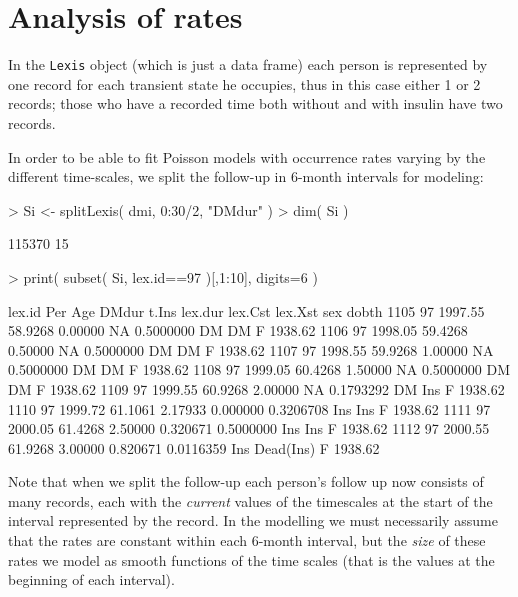 \documentclass[a4paper,twoside,12pt]{report}
\begin{document}
\section{Analysis of rates}

In the \texttt{Lexis} object (which is just a data frame) each person
is represented by one record for each transient state he occupies,
thus in this case either 1 or 2 records; those who have a recorded
time both without and with insulin have two records.

In order to be able to fit Poisson models with occurrence rates varying
by the different time-scales, we split the follow-up in 6-month intervals
for modeling:
\begin{Schunk}
\begin{Sinput}
> Si <- splitLexis( dmi, 0:30/2, "DMdur" )
> dim( Si )
\end{Sinput}
\begin{Soutput}
[1] 115370     15
\end{Soutput}
\begin{Sinput}
> print( subset( Si, lex.id==97 )[,1:10], digits=6 )
\end{Sinput}
\begin{Soutput}
     lex.id     Per     Age   DMdur    t.Ins   lex.dur lex.Cst   lex.Xst sex   dobth
1105     97 1997.55 58.9268 0.00000       NA 0.5000000      DM        DM   F 1938.62
1106     97 1998.05 59.4268 0.50000       NA 0.5000000      DM        DM   F 1938.62
1107     97 1998.55 59.9268 1.00000       NA 0.5000000      DM        DM   F 1938.62
1108     97 1999.05 60.4268 1.50000       NA 0.5000000      DM        DM   F 1938.62
1109     97 1999.55 60.9268 2.00000       NA 0.1793292      DM       Ins   F 1938.62
1110     97 1999.72 61.1061 2.17933 0.000000 0.3206708     Ins       Ins   F 1938.62
1111     97 2000.05 61.4268 2.50000 0.320671 0.5000000     Ins       Ins   F 1938.62
1112     97 2000.55 61.9268 3.00000 0.820671 0.0116359     Ins Dead(Ins)   F 1938.62
\end{Soutput}
\end{Schunk}
Note that when we split the follow-up each person's follow up now
consists of many records, each with the \emph{current} values of the
timescales at the start of the interval represented by the record. In
the modelling we must necessarily assume that the rates are constant
within each 6-month interval, but the \emph{size} of these rates we
model as smooth functions of the time scales (that is the values at
the beginning of each interval).
\end{document}
